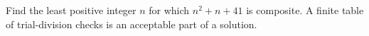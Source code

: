Find the least positive integer $n$ for which $n^2+n+41$ is composite. A finite table of trial-division checks is an acceptable part of a solution.
